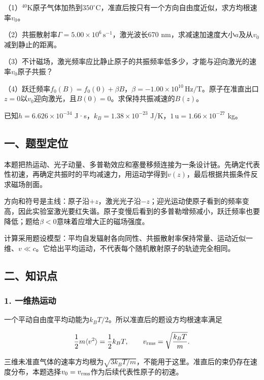 \documentclass[12pt,a4paper,fontset=fandol]{ctexart}
\begin{document}
（1）\(^{40}\mathrm K\)原子气体加热到\(350^\circ\)C，准直后按只有一个方向自由度近似，求方均根速率\(v_0\)。

（2）共振散射率\(\Gamma=5.00\times10^6\,\mathrm{s^{-1}}\)，激光波长670
nm，求减速加速度大小\(a\)及从\(v_0\)减到静止的距离。

（3）不计磁场，激光频率应比静止原子的共振频率低多少，才能与迎向激光的速率\(v_0\)原子共振？

（4）跃迁频率\(f_0(B)=f_0(0)+\beta B\)，\(\beta=-1.00\times10^{10}\,\mathrm{Hz/T}\)。原子在准直出口\(z=0\)以\(v_0\)迎向激光，且\(B(0)=0\)。求保持共振减速的\(B(z)\)。

已知\(h=6.626\times10^{-34}\) J·s，\(k_B=1.38\times10^{-23}\)
J/K，\(1\,\mathrm u=1.66\times10^{-27}\) kg。

\subsection{一、题型定位}\label{ux4e00ux9898ux578bux5b9aux4f4d-4}

本题把热运动、光子动量、多普勒效应和塞曼移频连接为一条设计链。先确定代表性初速，再确定共振时的平均减速力，用运动学得到\(v(z)\)，最后根据共振条件反求磁场剖面。

方向和符号是主线：原子沿\(+z\)，激光光子沿\(-z\)；迎光运动使原子看到的频率变高，因此实验室激光要红失谐。原子变慢后看到的多普勒增频减小，跃迁频率也要降低；题给\(\beta<0\)意味着应增大正的磁场强度。

计算采用题设模型：平均自发辐射各向同性、共振散射率保持常量、运动近似一维、\(v\ll c\)。它给出平均运动，不代表每个随机散射原子的轨迹完全相同。

\subsection{二、知识点}\label{ux4e8cux77e5ux8bc6ux70b9-4}

\subsubsection{1. 一维热运动}\label{ux4e00ux7ef4ux70edux8fd0ux52a8}

一个平动自由度平均动能为\(k_BT/2\)。所以准直后的题设方均根速率满足

\[
\frac12m\langle v^2\rangle=\frac12k_BT,
\qquad v_{\rm rms}=\sqrt{\frac{k_BT}{m}}.
\]

三维未准直气体的速率方均根为\(\sqrt{3k_BT/m}\)，不能用于这里。准直后的束仍存在速度分布，本题选择\(v_0=v_{\rm rms}\)作为后续代表性原子的初速。
\end{document}
